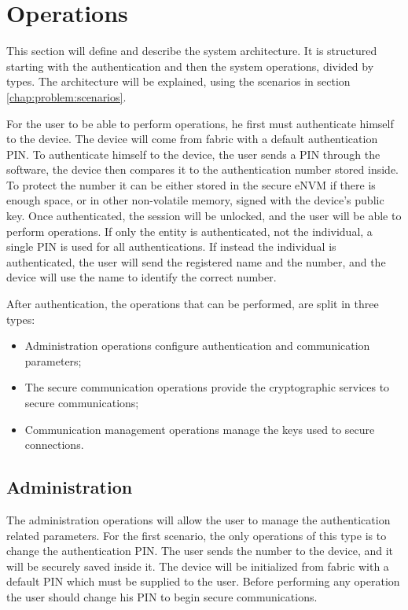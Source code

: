 \section{Operations}\label{chap:arch:ops}

This section will define and describe the system architecture. It is structured starting with the authentication and then the system operations, divided by types.
The architecture will be explained, using the scenarios in section \ref{chap:problem:scenarios}.

For the user to be able to perform operations, he first must authenticate himself to the device. The device will come from fabric with a default authentication \ac{PIN}. To authenticate himself to the device, the user sends a \ac{PIN} through the software, the device then compares it to the authentication number stored inside. To protect the number it can be either stored in the secure eNVM if there is enough space, or in other non-volatile memory, signed with the device's public key. Once authenticated, the session will be unlocked, and the user will be able to perform operations.
If only the entity is authenticated, not the individual, a single \ac{PIN} is used for all authentications.
If instead the individual is authenticated, the user will send the registered name and the number, and the device will use the name to identify the correct number.

After authentication, the operations that can be performed, are split in three types:
\begin{itemize}
    \item Administration operations configure authentication and communication parameters;
    \item The secure communication operations provide the cryptographic services to secure communications;
    \item Communication management operations manage the keys used to secure connections.
\end{itemize}

\subsection{Administration}\label{chap:arch:ops:admin}

The administration operations will allow the user to manage the authentication related parameters.
For the first scenario, the only operations of this type is to change the authentication \ac{PIN}. The user sends the number to the device, and it will be securely saved inside it. The device will be initialized from fabric with a default \ac{PIN} which must be supplied to the user. Before performing any operation the user should change his PIN to begin secure communications.

